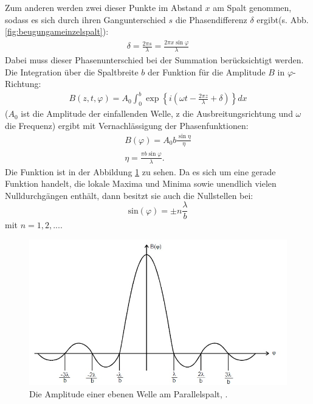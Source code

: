 Zum anderen werden zwei dieser Punkte im Abstand $x$ am Spalt genommen, sodass es sich durch ihren Gangunterschied $s$ die Phasendifferenz  $\delta$ ergibt(s. Abb. \ref{fig:beugungameinzelspalt}):
\begin{align*}
\delta = \frac{2\pi s}{\lambda} = \frac{2\pi x\sin\varphi}{\lambda}
\end{align*}
Dabei muss dieser Phasenunterschied bei der Summation berücksichtigt werden. Die Integration über die Spaltbreite $b$ der Funktion für die Amplitude $B$ in $\varphi$-Richtung:
\begin{align*}
B(z,t,\varphi)=A_0 \int_0^b \exp\left\{i\left(\omega t - \frac{2\pi z}{\lambda} + \delta\right)\right\}dx
\end{align*} 
($A_0$ ist die Amplitude der einfallenden Welle, z die Ausbreitungsrichtung und $\omega$ die Frequenz) ergibt mit Vernachlässigung der Phasenfunktionen:
\begin{align*}
B(\varphi)=A_0 b \frac{\sin\eta}{\eta}\\
\eta=\frac{\pi b \sin\varphi}{\lambda}\text{.} 
\end{align*} 
Die Funktion ist in der Abbildung \ref{fig:interferenzmustereinzelspalt} zu sehen. Da es sich um eine gerade Funktion handelt, die lokale Maxima und Minima sowie unendlich vielen Nulldurchgängen enthält, dann besitzt sie auch die Nullstellen bei:
\begin{equation*}
\text{sin}(\varphi) = \pm n\frac{\lambda}{b}
\end{equation*}
mit $n= 1,2,...$.

\begin{figure}[h!]
	\centering
	\includegraphics[width=0.9\linewidth]{InterferenzmusterEinzelspalt.jpg}
	\caption{Die Amplitude einer ebenen Welle am Parallelspalt, \cite[4]{anleitung406}.}
	\label{fig:interferenzmustereinzelspalt}
\end{figure}


